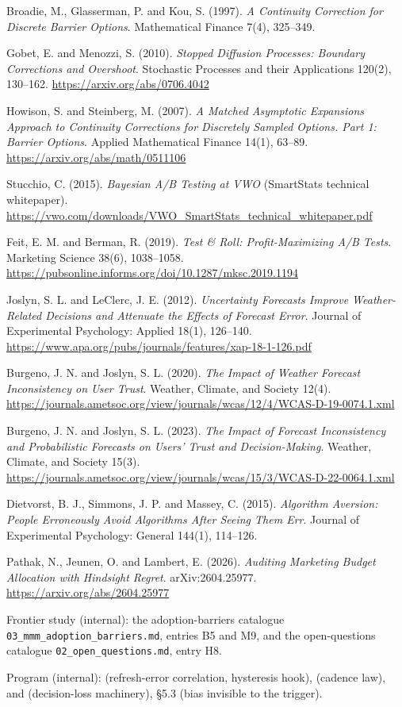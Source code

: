 \begin{enumerate}[label={[\arabic*]},leftmargin=2.5em]
\item Broadie, M., Glasserman, P. and Kou, S. (1997). \emph{A Continuity Correction for Discrete Barrier Options}. Mathematical Finance 7(4), 325--349.
\item Gobet, E. and Menozzi, S. (2010). \emph{Stopped Diffusion Processes: Boundary Corrections and Overshoot}. Stochastic Processes and their Applications 120(2), 130--162. \url{https://arxiv.org/abs/0706.4042}
\item Howison, S. and Steinberg, M. (2007). \emph{A Matched Asymptotic Expansions Approach to Continuity Corrections for Discretely Sampled Options. Part 1: Barrier Options}. Applied Mathematical Finance 14(1), 63--89. \url{https://arxiv.org/abs/math/0511106}
\item Stucchio, C. (2015). \emph{Bayesian A/B Testing at VWO} (SmartStats technical whitepaper). \url{https://vwo.com/downloads/VWO_SmartStats_technical_whitepaper.pdf}
\item Feit, E. M. and Berman, R. (2019). \emph{Test \& Roll: Profit-Maximizing A/B Tests}. Marketing Science 38(6), 1038--1058. \url{https://pubsonline.informs.org/doi/10.1287/mksc.2019.1194}
\item Joslyn, S. L. and LeClerc, J. E. (2012). \emph{Uncertainty Forecasts Improve Weather-Related Decisions and Attenuate the Effects of Forecast Error}. Journal of Experimental Psychology: Applied 18(1), 126--140. \url{https://www.apa.org/pubs/journals/features/xap-18-1-126.pdf}
\item Burgeno, J. N. and Joslyn, S. L. (2020). \emph{The Impact of Weather Forecast Inconsistency on User Trust}. Weather, Climate, and Society 12(4). \url{https://journals.ametsoc.org/view/journals/wcas/12/4/WCAS-D-19-0074.1.xml}
\item Burgeno, J. N. and Joslyn, S. L. (2023). \emph{The Impact of Forecast Inconsistency and Probabilistic Forecasts on Users' Trust and Decision-Making}. Weather, Climate, and Society 15(3). \url{https://journals.ametsoc.org/view/journals/wcas/15/3/WCAS-D-22-0064.1.xml}
\item Dietvorst, B. J., Simmons, J. P. and Massey, C. (2015). \emph{Algorithm Aversion: People Erroneously Avoid Algorithms After Seeing Them Err}. Journal of Experimental Psychology: General 144(1), 114--126.
\item Pathak, N., Jeunen, O. and Lambert, E. (2026). \emph{Auditing Marketing Budget Allocation with Hindsight Regret}. arXiv:2604.25977. \url{https://arxiv.org/abs/2604.25977}
\item Frontier study (internal): the adoption-barriers catalogue \texttt{03\_mmm\_adoption\_barriers.md}, entries B5 and M9, and the open-questions catalogue \texttt{02\_open\_questions.md}, entry H8.
\item Program (internal):  (refresh-error correlation, hysteresis hook),  (cadence law),  and  (decision-loss machinery),  \S5.3 (bias invisible to the trigger).
\end{enumerate}
\endgroup
